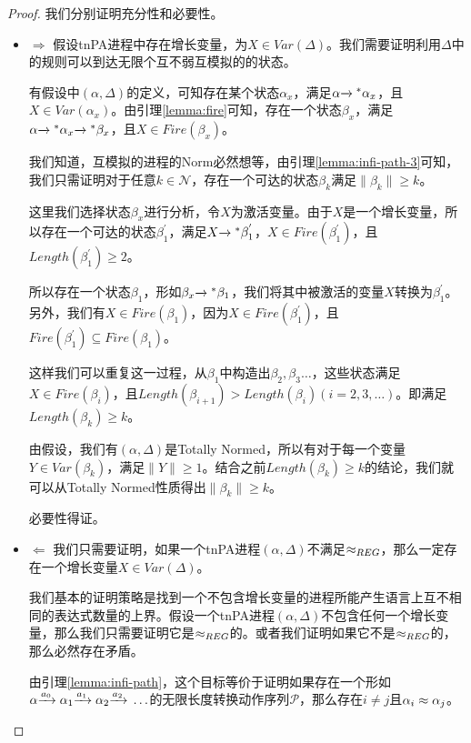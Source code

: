 \begin{proof}
我们分别证明充分性和必要性。
\begin{itemize}
	\item $\Rightarrow$ 假设tnPA进程中存在增长变量，为$X\in Var(\Delta)$。我们需要证明利用$\Delta$中的规则可以到达无限个互不弱互模拟的的状态。

有假设中$(\alpha,\Delta)$的定义，可知存在某个状态$\alpha_x$，满足$\alpha{\xrightarrow{}{}}^{*}\alpha_x$，且$X\in Var(\alpha_x)$。由引理\ref{lemma:fire}可知，存在一个状态$\beta_x$，满足$\alpha{\xrightarrow{}{}}^{*}\alpha_x{\xrightarrow{}{}}^{*}\beta_x$，且$X\in Fire(\beta_x)$。

我们知道，互模拟的进程的Norm必然想等，由引理\ref{lemma:infi-path-3}可知，我们只需证明对于任意$k\in \mathcal{N}$，存在一个可达的状态$\beta_k$满足$\|\beta_k\|\geq k$。

这里我们选择状态$\beta_x$进行分析，令$X$为激活变量。由于$X$是一个增长变量，所以存在一个可达的状态$\beta_1^{'}$，满足$X{\xrightarrow{}{}}^{*}\beta_1^{'}$，$X\in Fire(\beta_1^{'})$，且$Length(\beta_1^{'})\geq 2$。

所以存在一个状态$\beta_1$，形如$\beta_x{\xrightarrow{}{}}^{*}\beta_1$，我们将其中被激活的变量$X$转换为$\beta_1^{'}$。另外，我们有$X\in Fire(\beta_1)$，因为$X\in Fire(\beta_1^{'})$，且$Fire(\beta_1^{'})\subseteq Fire(\beta_1)$。

这样我们可以重复这一过程，从$\beta_1$中构造出$\beta_2,\beta_3\ldots$，这些状态满足$X\in Fire(\beta_i)$，且$Length(\beta_{i+1})>Length(\beta_i)(i=2,3,\ldots)$。即满足$Length(\beta_k)\geq k$。

由假设，我们有$(\alpha,\Delta)$是Totally Normed，所以有对于每一个变量$Y\in Var(\beta_k)$，满足$\|Y\|\geq 1$。结合之前$Length(\beta_k)\geq k$的结论，我们就可以从Totally Normed性质得出$\|\beta_k\|\geq k$。

必要性得证。
	
	\item $\Leftarrow$ 我们只需要证明，如果一个tnPA进程$(\alpha,\Delta)$不满足$\approx_{REG}$，那么一定存在一个增长变量$X\in Var(\Delta)$。

我们基本的证明策略是找到一个不包含增长变量的进程所能产生语言上互不相同的表达式数量的上界。假设一个tnPA进程$(\alpha,\Delta)$不包含任何一个增长变量，那么我们只需要证明它是$\approx_{REG}$的。或者我们证明如果它不是$\approx_{REG}$的，那么必然存在矛盾。

由引理\ref{lemma:infi-path}，这个目标等价于证明如果存在一个形如$\alpha{\xrightarrow{a_0}{}}\alpha_1{\xrightarrow{a_1}{}}\alpha_2{\xrightarrow{a_2}{}}\ldots$的无限长度转换动作序列$\mathcal{P}$，那么存在$i\neq j$且$\alpha_i\approx \alpha_j$。


\end{itemize}
\end{proof}
